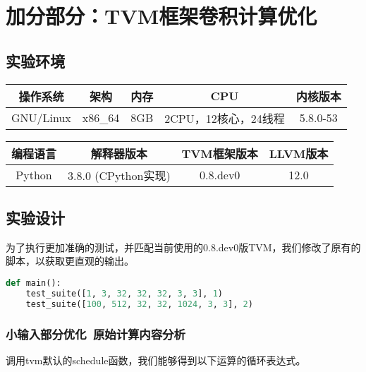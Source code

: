 \section{加分部分：TVM框架卷积计算优化}

\subsection{实验环境}

\begin{table}[H]
  \centering
  \begin{tabular}{c|c|c|c|c}
  \hline
  操作系统      & 架构   &  内存  & CPU & 内核版本       \\ \hline
  GNU/Linux & x86\_64 &   8GB  & 2CPU，12核心，24线程  & 5.8.0-53  \\ \hline
  \end{tabular}
\end{table}

\begin{table}[H]
    \centering
    \begin{tabular}{c|c|c|c}
    \hline
    编程语言   & 解释器版本    & TVM框架版本      & LLVM版本   \\ \hline
    Python & 3.8.0 (CPython实现) & 0.8.dev0  & 12.0 \\ \hline
    \end{tabular}
  \end{table}

\subsection{实验设计}

为了执行更加准确的测试，并匹配当前使用的0.8.dev0版TVM，我们修改了原有的脚本，以获取更直观的输出。

\begin{lstlisting}[caption=测试组件示例,language=python]
def main():
    test_suite([1, 3, 32, 32, 32, 3, 3], 1)
    test_suite([100, 512, 32, 32, 1024, 3, 3], 2)
\end{lstlisting}


\subsubsection{小输入部分优化~原始计算内容分析}

调用tvm默认的schedule函数，我们能够得到以下运算的循环表达式。

